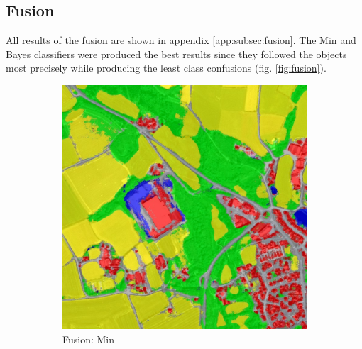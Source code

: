 \documentclass[10pt]{article}
\begin{document}
\subsection{Fusion}
All results of the fusion are shown in appendix \ref{app:subsec:fusion}. The Min and Bayes classifiers were produced the best results since they followed the objects most precisely while producing the least class confusions (fig. \ref{fig:fusion}).

\begin{figure}[H]
    \centering 
    \begin{subfigure}{0.49\textwidth}
        \centering
        \includegraphics[width=\textwidth]{T41000_30000_classif_Fusion_Min_weighted}
        \caption{Fusion: Min}
        \label{fig:fusion_min}
    \end{subfigure}
    \begin{subfigure}{0.49\textwidth}
        \centering

\end{subfigure}
\end{figure}
\end{document}
